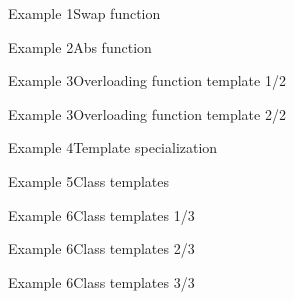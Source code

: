 
\begin{frame}[fragile]{Example 1}{Swap function}

\end{frame}

\begin{frame}[fragile]{Example 2}{Abs function}

\end{frame}

\begin{frame}[fragile]{Example 3}{Overloading function template 1/2}

\end{frame}

\begin{frame}[fragile]{Example 3}{Overloading function template 2/2}

\end{frame}

\begin{frame}[fragile]{Example 4}{Template specialization}

\end{frame}

\begin{frame}[fragile]{Example 5}{Class templates}

\end{frame}

\begin{frame}[fragile,shrink=0.9]{Example 6}{Class templates 1/3}

\end{frame}

\begin{frame}[fragile,shrink=0.9]{Example 6}{Class templates 2/3}

\end{frame}

\begin{frame}[fragile]{Example 6}{Class templates 3/3}

\end{frame}


